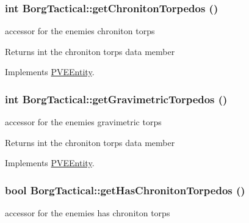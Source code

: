 \hypertarget{classBorgTactical_a7ec4b30da34f8218af05f3b6f8edae7a}{
\subsubsection[{getChronitonTorpedos}]{\setlength{\rightskip}{0pt plus 5cm}int BorgTactical::getChronitonTorpedos ()}}
\label{d0/d4e/classBorgTactical_a7ec4b30da34f8218af05f3b6f8edae7a}
accessor for the enemies chroniton torps

\begin{DoxyReturn}{Returns}
int the chroniton torps data member 
\end{DoxyReturn}


Implements \hyperlink{classPVEEntity}{PVEEntity}.

\hypertarget{classBorgTactical_a8fe417f1c8ae45dbef3c47799c53ed67}{
\subsubsection[{getGravimetricTorpedos}]{\setlength{\rightskip}{0pt plus 5cm}int BorgTactical::getGravimetricTorpedos ()}}
\label{d0/d4e/classBorgTactical_a8fe417f1c8ae45dbef3c47799c53ed67}
accessor for the enemies gravimetric torps

\begin{DoxyReturn}{Returns}
int the chroniton torps data member 
\end{DoxyReturn}


Implements \hyperlink{classPVEEntity}{PVEEntity}.

\hypertarget{classBorgTactical_a8935e0a04c713ffe97bd2174cd07e378}{
\subsubsection[{getHasChronitonTorpedos}]{\setlength{\rightskip}{0pt plus 5cm}bool BorgTactical::getHasChronitonTorpedos ()}}
\label{d0/d4e/classBorgTactical_a8935e0a04c713ffe97bd2174cd07e378}
accessor for the enemies has chroniton torps

